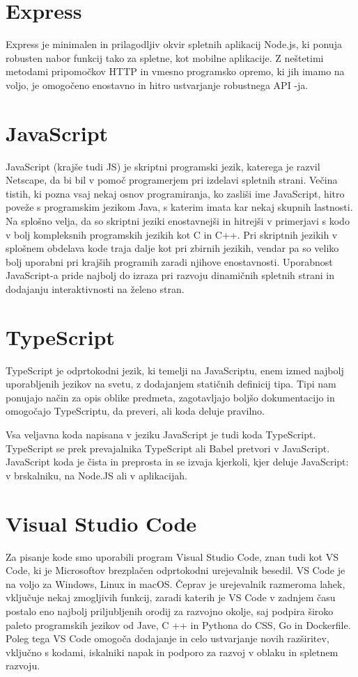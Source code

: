 \documentclass[a4paper, 12pt]{book}
\begin{document}
\section{Express}
Express je minimalen in prilagodljiv okvir spletnih aplikacij Node.js, ki ponuja robusten nabor funkcij tako za spletne, kot mobilne aplikacije. Z neštetimi metodami pripomočkov HTTP in vmesno programsko opremo, ki jih imamo na voljo, je omogočeno enostavno in hitro ustvarjanje robustnega API -ja.~\cite{Express}

\section{JavaScript}
JavaScript (krajše tudi JS) je skriptni programski jezik, katerega je razvil Netscape, da bi bil v pomoč programerjem pri izdelavi spletnih strani. Večina tistih, ki pozna vsaj nekaj osnov programiranja, ko zasliši ime JavaScript, hitro poveže s programskim jezikom Java, s katerim imata kar nekaj skupnih lastnosti. Na splošno velja, da so skriptni jeziki enostavnejši in hitrejši v primerjavi s kodo v bolj kompleksnih programskih jezikih kot C in C++. Pri skriptnih jezikih v splošnem obdelava kode traja dalje kot pri zbirnih jezikih, vendar pa so veliko bolj uporabni pri krajših programih zaradi njihove enostavnosti. Uporabnost JavaScript-a pride najbolj do izraza pri razvoju dinamičnih spletnih strani in dodajanju interaktivnosti na želeno stran.~\cite{JS}

\section{TypeScript}
TypeScript je odprtokodni jezik, ki temelji na JavaScriptu, enem izmed najbolj uporabljenih jezikov na svetu, z dodajanjem statičnih definicij tipa. Tipi nam ponujajo način za opis oblike predmeta, zagotavljajo boljšo dokumentacijo in omogočajo TypeScriptu, da preveri, ali koda deluje pravilno.

Vsa veljavna koda napisana v jeziku JavaScript je tudi koda TypeScript. TypeScript se prek prevajalnika TypeScript ali Babel pretvori v JavaScript. JavaScript koda je čista in preprosta in se izvaja kjerkoli, kjer deluje JavaScript: v brskalniku, na Node.JS ali v aplikacijah.~\cite{TS}

\section{Visual Studio Code}
Za pisanje kode smo uporabili program Visual Studio Code, znan tudi kot VS Code, ki je Microsoftov brezplačen odprtokodni urejevalnik besedil. VS Code je na voljo za Windows, Linux in macOS. Čeprav je urejevalnik razmeroma lahek, vključuje nekaj zmogljivih funkcij, zaradi katerih je VS Code v zadnjem času postalo eno najbolj priljubljenih orodij za razvojno okolje, saj podpira široko paleto programskih jezikov od Jave, C ++ in Pythona do CSS, Go in Dockerfile. Poleg tega VS Code omogoča dodajanje in celo ustvarjanje novih razširitev, vključno s kodami, iskalniki napak in podporo za razvoj v oblaku in spletnem razvoju.~\cite{VSC}
\end{document}
